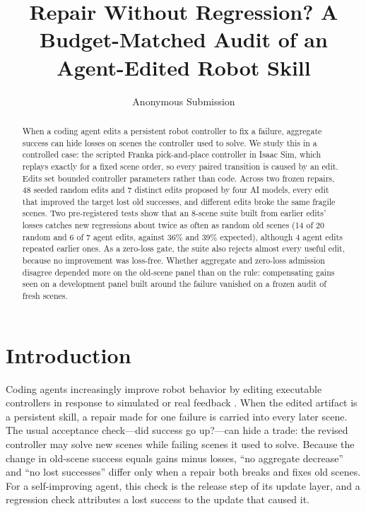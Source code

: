 \documentclass[letterpaper]{article} %
\title{Repair Without Regression? A Budget-Matched Audit of an Agent-Edited Robot Skill}
\author{
    Anonymous Submission
}
\begin{document}
\maketitle

\begin{abstract}
When a coding agent edits a persistent robot controller to fix a failure, aggregate success can hide losses on scenes the controller used to solve. We study this in a controlled case: the scripted Franka pick-and-place controller in Isaac Sim, which replays exactly for a fixed scene order, so every paired transition is caused by an edit. Edits set bounded controller parameters rather than code. Across two frozen repairs, 48 seeded random edits and 7 distinct edits proposed by four AI models, every edit that improved the target lost old successes, and different edits broke the same fragile scenes. Two pre-registered tests show that an 8-scene suite built from earlier edits' losses catches new regressions about twice as often as random old scenes (14 of 20 random and 6 of 7 agent edits, against 36\% and 39\% expected), although 4 agent edits repeated earlier ones. As a zero-loss gate, the suite also rejects almost every useful edit, because no improvement was loss-free. Whether aggregate and zero-loss admission disagree depended more on the old-scene panel than on the rule: compensating gains seen on a development panel built around the failure vanished on a frozen audit of fresh scenes.
\end{abstract}

\section{Introduction}
Coding agents increasingly improve robot behavior by editing executable controllers in response to simulated or real feedback \citep{kuroki2026closedloop,xiao2026enpire,aphale2026selfrepair}. When the edited artifact is a persistent skill, a repair made for one failure is carried into every later scene. The usual acceptance check---did success go up?---can hide a trade: the revised controller may solve new scenes while failing scenes it used to solve. Because the change in old-scene success equals gains minus losses, ``no aggregate decrease'' and ``no lost successes'' differ only when a repair both breaks and fixes old scenes. For a self-improving agent, this check is the release step of its update layer, and a regression check attributes a lost success to the update that caused it.
\end{document}
